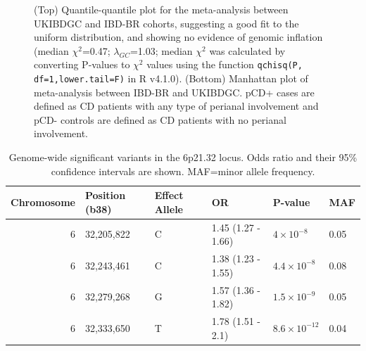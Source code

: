 \begin{figure}[H]
\begin{subfigure}[t]{1.0\textwidth}
        
    \end{subfigure} 
    \caption[QQ and Manhattan plots of the pCD GWAS meta-analysis results]{(Top) Quantile-quantile plot for the meta-analysis between UKIBDGC and IBD-BR cohorts, suggesting a good fit to the uniform distribution, and showing no evidence of genomic inflation (median $\chi^{2}$=0.47; $\lambda_{GC}$=1.03; median $\chi^{2}$ was calculated by converting P-values to $\chi^{2}$  values using the function \Verb+qchisq(P, df=1,lower.tail=F)+ in R v4.1.0). (Bottom) Manhattan plot of meta-analysis between IBD-BR and UKIBDGC. pCD+ cases are defined as CD patients with any type of perianal involvement and pCD- controls are defined as CD patients with no perianal involvement.}
    \label{fig:meta_qq_manhattan}
    \end{figure}

  \begin{table}[H]
    \caption[pCD GWAS meta-analysis genome-wide significant SNPs]{Genome-wide significant variants in the 6p21.32 locus. Odds ratio and their 95\% confidence intervals are shown. MAF=minor allele frequency.}
    \label{table:gws}
    \centering\begingroup\fontsize{10}{12}\selectfont
    
    \begin{tabular}[t]{|r|l|l|l|l|l|}
    \hline
    Chromosome & Position (b38) & Effect Allele & OR & P-value & MAF\\
    \hline
    6 & 32,205,822 & C & 1.45 (1.27 - 1.66) & $4\times10^{-8}$ & 0.05\\
    \hline
    6 & 32,243,461 & C & 1.38 (1.23 - 1.55) & $4.4\times10^{-8}$ & 0.08\\
    \hline
    6 & 32,279,268 & G & 1.57 (1.36 - 1.82) & $1.5\times10^{-9}$ & 0.05\\
    \hline
    6 & 32,333,650 & T & 1.78 (1.51 - 2.1) & $8.6\times10^{-12}$ & 0.04\\
    \hline
    \end{tabular}
    \endgroup{}
    \end{table}

